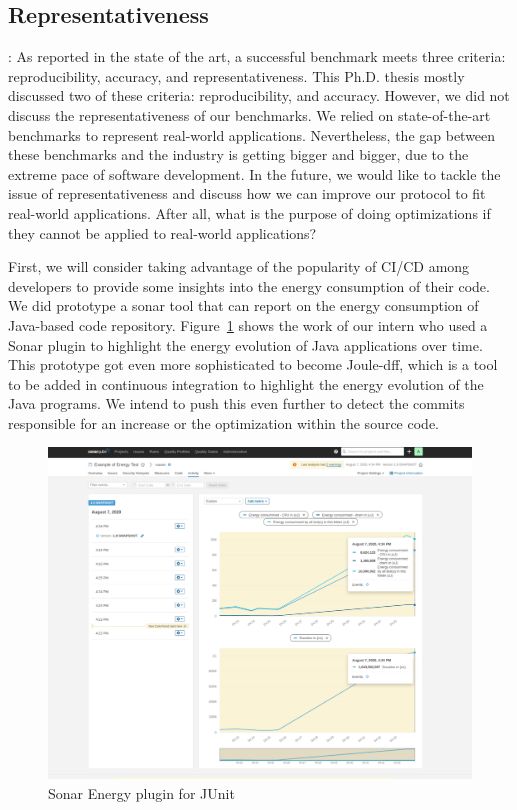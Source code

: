 \subsection*{Representativeness}:
As reported in the state of the art, a successful benchmark meets three criteria: reproducibility, accuracy, and representativeness.
This Ph.D. thesis mostly discussed two of these criteria: reproducibility, and accuracy.
However, we did not discuss the representativeness of our benchmarks.
We relied on state-of-the-art benchmarks to represent real-world applications.
Nevertheless, the gap between these benchmarks and the industry is getting bigger and bigger, due to the extreme pace of software development.
In the future, we would like to tackle the issue of representativeness and discuss how we can improve our protocol to fit real-world applications.
After all, what is the purpose of doing optimizations if they cannot be applied to real-world applications?

First, we will consider taking advantage of the popularity of CI/CD among developers to provide some insights into the energy consumption of their code.
We did prototype a sonar tool that can report on the energy consumption of Java-based code repository.
Figure~\ref{fig:JunitSonarplugin} shows the work of our intern who used a Sonar plugin to highlight the energy evolution of Java applications over time.
This prototype got even more sophisticated to become Joule-dff, which is a tool to be added in continuous integration to highlight the energy evolution of the Java programs.
We intend to push this even further to detect the commits responsible for an increase or the optimization within the source code.
\begin{figure}[!h]
      \centering
      \includegraphics[width=0.8\linewidth]{chapters/JunitSonarplugin}
      \caption{Sonar Energy plugin for JUnit}
      \label{fig:JunitSonarplugin}
\end{figure}


